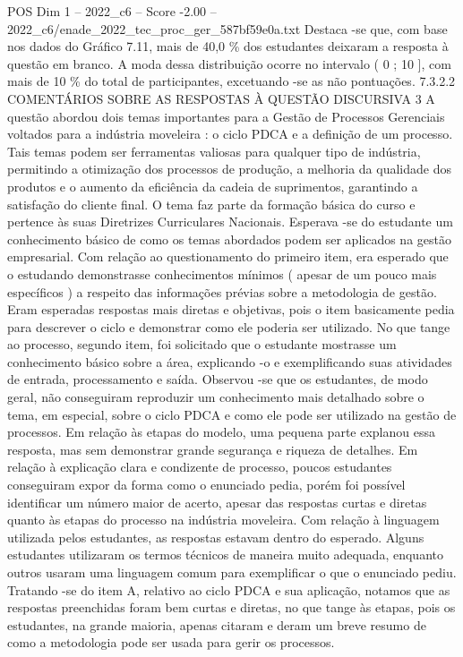 \begin{textsample}{POS Dim 1 – 2022\_c6 – Score -2.00 – 2022\_c6/enade\_2022\_tec\_proc\_ger\_587bf59e0a.txt}
Destaca -se que, com base nos dados do Gráfico 7.11, mais de 40,0 \% dos estudantes deixaram a resposta à questão em branco.
A moda dessa distribuição ocorre no intervalo ( 0 ; 10 ], com mais de 10 \% do total de participantes, excetuando -se as não pontuações. 7.3.2.2 COMENTÁRIOS SOBRE AS RESPOSTAS À QUESTÃO DISCURSIVA 3 A questão abordou dois temas importantes para a Gestão de Processos Gerenciais voltados para a indústria moveleira : o ciclo PDCA e a definição de um processo.
Tais temas podem ser ferramentas valiosas para qualquer tipo de indústria, permitindo a otimização dos processos de produção, a melhoria da qualidade dos produtos e o aumento da eficiência da cadeia de suprimentos, garantindo a satisfação do cliente final.
O tema faz parte da formação básica do curso e pertence às suas Diretrizes Curriculares Nacionais.
Esperava -se do estudante um conhecimento básico de como os temas abordados podem ser aplicados na gestão empresarial.
Com relação ao questionamento do primeiro item, era esperado que o estudando demonstrasse conhecimentos mínimos ( apesar de um pouco mais específicos ) a respeito das informações prévias sobre a metodologia de gestão.
Eram esperadas respostas mais diretas e objetivas, pois o item basicamente pedia para descrever o ciclo e demonstrar como ele poderia ser utilizado.
No que tange ao processo, segundo item, foi solicitado que o estudante mostrasse um conhecimento básico sobre a área, explicando -o e exemplificando suas atividades de entrada, processamento e saída.
Observou -se que os estudantes, de modo geral, não conseguiram reproduzir um conhecimento mais detalhado sobre o tema, em especial, sobre o ciclo PDCA e como ele pode ser utilizado na gestão de processos.
Em relação às etapas do modelo, uma pequena parte explanou essa resposta, mas sem demonstrar grande segurança e riqueza de detalhes.
Em relação à explicação clara e condizente de processo, poucos estudantes conseguiram expor da forma como o enunciado pedia, porém foi possível identificar um número maior de acerto, apesar das respostas curtas e diretas quanto às etapas do processo na indústria moveleira.
Com relação à linguagem utilizada pelos estudantes, as respostas estavam dentro do esperado.
Alguns estudantes utilizaram os termos técnicos de maneira muito adequada, enquanto outros usaram uma linguagem comum para exemplificar o que o enunciado pediu.
Tratando -se do item A, relativo ao ciclo PDCA e sua aplicação, notamos que as respostas preenchidas foram bem curtas e diretas, no que tange às etapas, pois os estudantes, na grande maioria, apenas citaram e deram um breve resumo de como a metodologia pode ser usada para gerir os processos.

\end{textsample}
